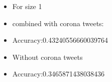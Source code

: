 \documentclass[12pt]{article}
\begin{document}
\begin{enumerate}[label=(\alph*)]
\begin{enumerate}[label=\roman*.]
\begin{itemize}
              \end{itemize}
              \begin{itemize}
                  \item For size 1%
                  \item combined with corona tweets:
                  \item Accuracy:0.43240556660039764
                  \item Without corona tweets
                  \item Accuracy:0.3465871438038436

\end{itemize}
\end{enumerate}
\end{enumerate}
\end{document}
